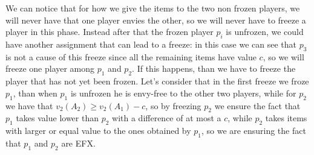 \documentclass{article}
\begin{document}
  We can notice that for how we give the items to the two non frozen players, we will never have that one player envies the other, so we will never have to freeze a player in this phase. Instead after that the frozen player $p_i$ is unfrozen, we could have another assignment that can lead to a freeze: in this case we can see that $p_3$ is not a cause of this freeze since all the remaining items have value $c$, so we will freeze one player among $p_1$ and $p_2$. If this happens, than we have to freeze the player that has not yet been frozen. Let's consider that in the first freeze we froze $p_1$, than when $p_1$ is unfrozen he is envy-free to the other two players, while for $p_2$ we have that $v_2(A_2) \ge v_2(A_1) - c$, so by freezing $p_2$ we ensure the fact that $p_1$ takes value lower than $p_2$ with a difference of at most a $c$, while $p_2$ takes items with larger or equal value to the ones obtained by $p_1$, so we are ensuring the fact that $p_1$ and $p_2$ are EFX.
\end{document}
